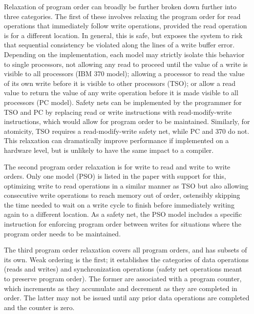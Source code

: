 \documentclass{article}
\begin{document}
\par Relaxation of program order can broadly be further broken down further into three categories. 
The first of these involves relaxing the program order for read operations that immediately follow write operations, provided the read operation is for a different location.
In general, this is safe, but exposes the system to risk that sequential consistency be violated along the lines of a write buffer error.
Depending on the implementation, each model may strictly isolate this behavior to single processors, not allowing any read to proceed until the value of a write is visible to all processors (IBM 370 model); allowing a processor to read the value of its own write before it is visible to other processors (TSO); or allow a read value to return the value of any write operation before it is made visible to all processors (PC model).
Safety nets can be implemented by the programmer for TSO and PC by replacing read or write instructions with read-modify-write instructions, which would allow for program order to be maintained.
Similarly, for atomicity, TSO requires a read-modify-write safety net, while PC and 370 do not.
This relaxation can dramatically improve performance if implemented on a hardware level, but is unlikely to have the same impact to a compiler.

\par The second program order relaxation is for write to read and write to write orders.
Only one model (PSO) is listed in the paper with support for this, optimizing write to read operations in a similar manner as TSO but also allowing consecutive write operations to reach memory out of order, ostensibly skipping the time needed to wait on a write cycle to finish before immediately writing again to a different location. As a safety net, the PSO model includes a specific instruction for enforcing program order between writes for situations where the program order needs to be maintained.

\par The third program order relaxation covers all program orders, and has subsets of its own. Weak ordering is the first; it establishes the categories of data operations (reads and writes) and synchronization operations (safety net operations meant to preserve program order). 
The former are associated with a program counter, which increments as they accumulate and decrement as they are completed in order. 
The latter may not be issued until any prior data operations are completed and the counter is zero.
\end{document}
